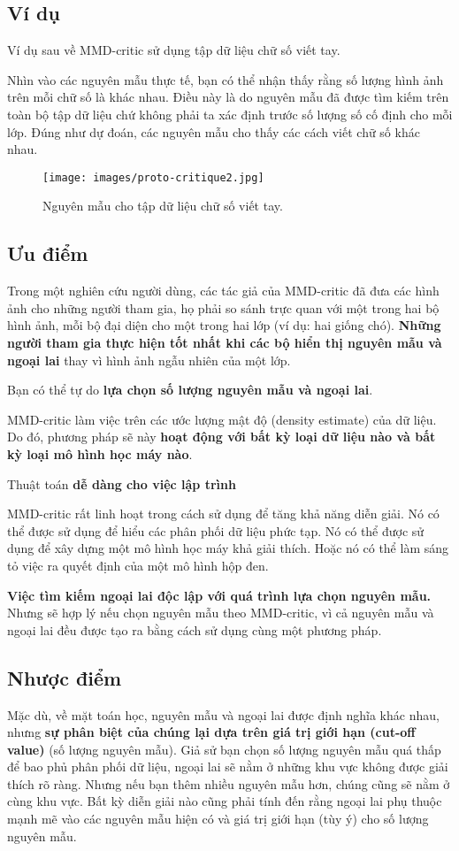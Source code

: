 \subsection{Ví dụ}
Ví dụ sau về MMD-critic sử dụng tập dữ liệu chữ số viết tay.

Nhìn vào các nguyên mẫu thực tế, bạn có thể nhận thấy rằng số lượng hình ảnh trên mỗi chữ số là khác nhau. Điều này là do nguyên mẫu đã được tìm kiếm trên toàn bộ tập dữ liệu chứ không phải ta xác định trước số lượng số cố định cho mỗi lớp. Đúng như dự đoán, các nguyên mẫu cho thấy các cách viết chữ số khác nhau.
\begin{figure*}[h!]
	\centering
	\texttt{[image: images/proto-critique2.jpg]}
    \caption{Nguyên mẫu cho tập dữ liệu chữ số viết tay.}
\end{figure*}
\subsection{Ưu điểm}
Trong một nghiên cứu người dùng, các tác giả của MMD-critic đã đưa các hình ảnh cho những người tham gia, họ phải so sánh trực quan với một trong hai bộ hình ảnh, mỗi bộ đại diện cho một trong hai lớp (ví dụ: hai giống chó). \textbf{Những người tham gia thực hiện tốt nhất khi các bộ hiển thị nguyên mẫu và ngoại lai} thay vì hình ảnh ngẫu nhiên của một lớp.

Bạn có thể tự do \textbf{lựa chọn số lượng nguyên mẫu và ngoại lai}.

MMD-critic làm việc trên các ước lượng mật độ (density estimate) của dữ liệu. Do đó, phương pháp sẽ này\textbf{ hoạt động với bất kỳ loại dữ liệu nào và bất kỳ loại mô hình học máy nào}.
 
Thuật toán \textbf{dễ dàng cho việc lập trình}
 
MMD-critic rất linh hoạt trong cách sử dụng để tăng khả năng diễn giải. Nó có thể được sử dụng để hiểu các phân phối dữ liệu phức tạp. Nó có thể được sử dụng để xây dựng một mô hình học máy khả giải thích. Hoặc nó có thể làm sáng tỏ việc ra quyết định của một mô hình hộp đen.

\textbf{Việc tìm kiếm ngoại lai độc lập với quá trình lựa chọn nguyên mẫu.} Nhưng sẽ hợp lý nếu chọn nguyên mẫu theo MMD-critic, vì cả nguyên mẫu và ngoại lai đều được tạo ra bằng cách sử dụng cùng một phương pháp.

\subsection{Nhược điểm}
Mặc dù, về mặt toán học, nguyên mẫu và ngoại lai được định nghĩa khác nhau, nhưng \textbf{sự phân biệt của chúng lại dựa trên giá trị giới hạn (cut-off value)} (số lượng nguyên mẫu). Giả sử bạn chọn số lượng nguyên mẫu quá thấp để bao phủ phân phối dữ liệu, ngoại lai sẽ nằm ở những khu vực không được giải thích rõ ràng. Nhưng nếu bạn thêm nhiều nguyên mẫu hơn, chúng cũng sẽ nằm ở cùng khu vực. Bất kỳ diễn giải nào cũng phải tính đến rằng ngoại lai phụ thuộc mạnh mẽ vào các nguyên mẫu hiện có và giá trị giới hạn (tùy ý) cho số lượng nguyên mẫu.

